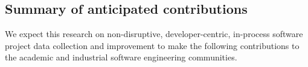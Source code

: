 
\subsection{Summary of anticipated contributions}

We expect this research on non-disruptive, developer-centric, in-process
software project data collection and improvement to make the following
contributions to the academic and industrial software engineering
communities. 

